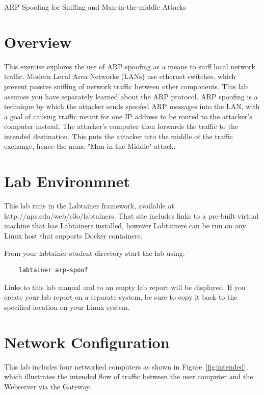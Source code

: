 


\begin{center}
{\LARGE ARP Spoofing for Sniffing and Man-in-the-middle Attacks}
\vspace{0.1in}\\
\end{center}

\copyrightnotice

\section{Overview}
This exercise explores the use of ARP spoofing as a means to
sniff local network traffic.  Modern Local Area Networks (LANs)
use ethernet switches, which prevent passive sniffing of network
traffic between other components.  This lab assumes you have
separately learned about the ARP protocol.  ARP spoofing is
a technique by which the attacker sends spoofed ARP messages
into the LAN, with a goal of causing traffic meant for one IP
address to be routed to the attacker's computer instead.  The
attacker's computer then forwards the traffic to the intended
destination.  This puts the attacker into the middle of the
traffic exchange, hence the name "Man in the Middle" attack.

\section{Lab Environmnet}
This lab runs in the Labtainer framework,
available at http://nps.edu/web/c3o/labtainers.
That site includes links to a pre-built virtual machine
that has Labtainers installed, however Labtainers can
be run on any Linux host that supports Docker containers.

From your labtainer-student directory start the lab using:
\begin{verbatim}
    labtainer arp-spoof
\end{verbatim}
Links to this lab manual and to an empty lab report will be displayed.  If you create your lab report on a separate system, 
be sure to copy it back to the specified location on your Linux system.


\section{Network Configuration}
This lab includes four networked computers as shown in Figure~\ref{fig:intended},
which illustrates the intended flow of traffic between the user computer and
the Webserver via the Gateway.  

